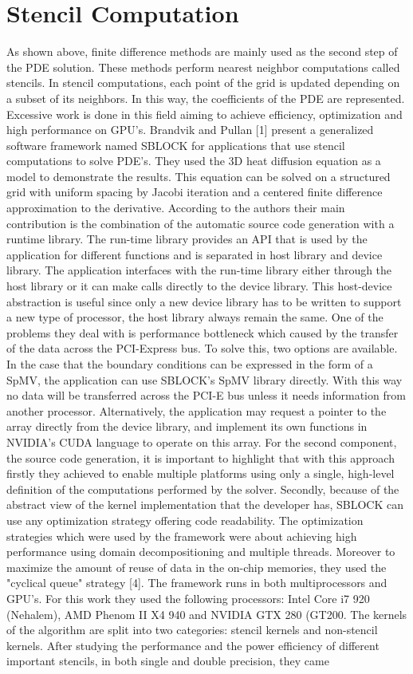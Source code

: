 \section{Stencil Computation}
As shown above, finite difference methods are mainly used as the second step of the PDE solution. These methods perform nearest neighbor computations called stencils. In stencil computations, each point of the grid is updated depending on a subset of its neighbors. In this way, the coefficients of the PDE are represented. Excessive work is done in this field aiming to achieve efficiency, optimization and high performance on GPU's. 
Brandvik and Pullan [1] present a generalized software framework named SBLOCK for applications that use stencil computations to solve PDE’s. They used the 3D heat diffusion equation as a model to demonstrate the results. This equation can be solved on a structured grid with uniform spacing by Jacobi iteration and a centered finite difference approximation to the derivative. According to the authors their main contribution is the combination of the automatic source code generation with a runtime library. The run-time library provides an API that is used by the application for different functions and is separated in host library and device library. The application interfaces with the run-time library either through the host library or it can make calls directly to the device library. This host-device abstraction is useful since only a new device library has to be written to support a new type of processor, the host library always remain the same. One of the problems they deal with is performance bottleneck which caused by the transfer of the data across the PCI-Express bus. To solve this, two options are available. In the case that the boundary conditions can be expressed in the form of a SpMV, the application can use SBLOCK’s SpMV library directly. With this way no data will be transferred across the PCI-E bus unless it needs information from another processor. Alternatively, the application may request a pointer to the array directly from the device library, and implement its own functions in NVIDIA’s CUDA language to operate on this array. For the second component, the source code generation, it is important to highlight that with this approach firstly they achieved to enable multiple platforms using only a single, high-level definition of the computations performed by the solver. Secondly, because of the abstract view of the kernel implementation that the developer has, SBLOCK can use any optimization strategy offering code readability. The optimization strategies which were used by the framework were about achieving high performance using domain decompositioning and multiple threads. Moreover to maximize the amount of reuse of data in the on-chip memories, they used the "cyclical queue" strategy [4]. The framework runs in both multiprocessors and GPU’s. For this work they used the following processors: Intel Core i7 920 (Nehalem), AMD Phenom II X4 940 and NVIDIA GTX 280 (GT200. The kernels of the algorithm are split into two categories: stencil kernels and non-stencil kernels. After studying the performance and the power efficiency of different important stencils, in both single and double precision, they came 